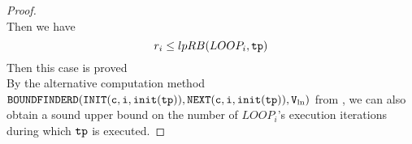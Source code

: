 \begin{proof}
        \\
        Then we have
        \[ 
          r_i \leq lpRB(LOOP_i, \mathtt{tp}) 
          \]
        Then this case is proved
        \\
        By the alternative computation method 
        $\mathtt{BOUNDFINDERD(INIT(c, i, \mathtt{init}(\mathtt{tp})), NEXT(c, i, \mathtt{init}(\mathtt{tp})), V_{\ln})}$ from \cite{GulwaniJK09},
        we can also obtain a sound upper bound on
        the number of $LOOP_i$'s execution iterations
        during which $\mathtt{tp}$ is executed. 
  \end{proof}

